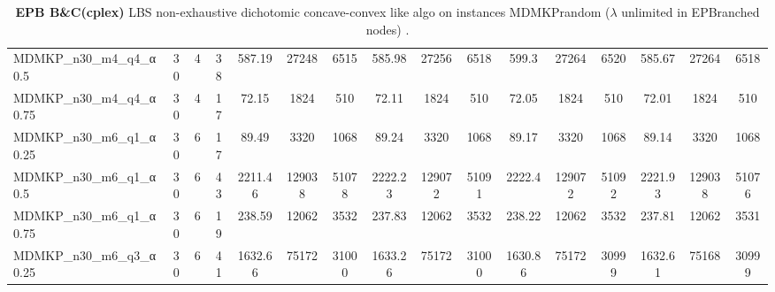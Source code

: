 \begin{sidewaystable}[!ht]
{\begin{tabular}{lccccccccccccccc}
MDMKP\_n30\_m4\_q4\_α0.5 & 30 & 4 & 38 & 587.19 & 27248 & 6515 & 585.98 & 27256 & 6518 & 599.3 & 27264 & 6520 & 585.67 & 27264 & 6518 \\
MDMKP\_n30\_m4\_q4\_α0.75 & 30 & 4 & 17 & 72.15 & 1824 & 510 & 72.11 & 1824 & 510 & 72.05 & 1824 & 510 &  \textcolor{blue2}{72.01} & 1824 & 510 \\
MDMKP\_n30\_m6\_q1\_α0.25 & 30 & 6 & 17 & 89.49 & 3320 & 1068 & 89.24 & 3320 & 1068 & 89.17 & 3320 & 1068 &  \textcolor{blue2}{89.14} & 3320 & 1068 \\
MDMKP\_n30\_m6\_q1\_α0.5 & 30 & 6 & 43 & 2211.46 & 129038 & 51078 & 2222.23 & 129072 & 51091 & 2222.4 & 129072 & 51092 & 2221.93 & 129038 & 51076 \\
MDMKP\_n30\_m6\_q1\_α0.75 & 30 & 6 & 19 & 238.59 & 12062 & 3532 & 237.83 & 12062 & 3532 & 238.22 & 12062 & 3532 &  \textcolor{blue2}{237.81} & 12062 & 3531 \\
MDMKP\_n30\_m6\_q3\_α0.25 & 30 & 6 & 41 & 1632.66 & 75172 & 31000 & 1633.26 & 75172 & 31000 &  \textcolor{blue2}{1630.86} & 75172 & 30999 & 1632.61 & 75168 & 30999 \\
\bottomrule
\end{tabular}
}%
\caption{\textbf{EPB B\&C(cplex) }LBS non-exhaustive dichotomic concave-convex like algo on instances MDMKPrandom ($\lambda$ unlimited in EPBranched nodes) .}
\label{tab:table2_lambda_EPB_MDMKPrandom }
\end{sidewaystable}
